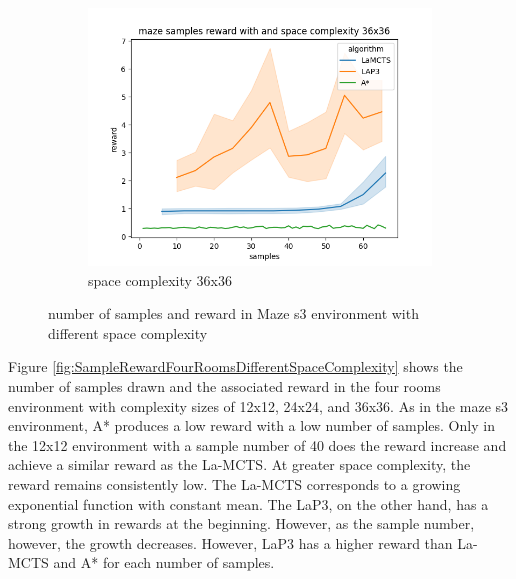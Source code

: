 \documentclass[bibliography=totoc]{scrartcl}
\begin{document}
\begin{figure}[H]
	\begin{subfigure}[b]{0.3\linewidth}
		\includegraphics[width=\linewidth]{img/maze_samples__reward_b_8_LAP3_MCTS_AStar_interrupted_36.png}
        \caption{space complexity 36x36}
	\end{subfigure}
	\caption{number of samples and reward in Maze s3 environment with different space complexity}
	\label{fig:SampleRewardMazeDifferentSpaceComplexity}
\end{figure}

Figure \ref{fig:SampleRewardFourRoomsDifferentSpaceComplexity} shows the number of samples drawn and the associated reward in the four rooms environment with complexity sizes of 12x12, 24x24, and 36x36.
As in the maze s3 environment, A* produces a low reward with a low number of samples.
Only in the 12x12 environment with a sample number of 40 does the reward increase and achieve a similar reward as the \ac{La-MCTS}.
At greater space complexity, the reward remains consistently low.
The \ac{La-MCTS} corresponds to a growing exponential function with constant mean.
The \ac{LaP3}, on the other hand, has a strong growth in rewards at the beginning.
However, as the sample number, however, the growth decreases.
However, \ac{LaP3} has a higher reward than \ac{La-MCTS} and A* for each number of samples.
\end{document}
